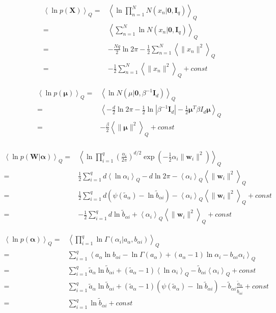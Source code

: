 \documentclass[10pt]{article}
\newcommand{\Angle}[1]{\left \langle #1 \right \rangle}
\newcommand{\Eq}[1]{\Angle{#1}_Q}
\newcommand{\Det}[1]{\left| #1 \right|}
\begin{document}
	\begin{align}
		\Eq{\ln{p(\bm{X})}}=&\Eq{\ln{\prod_{n=1}^{N}{N(x_n|\bm{0},\bm{I}_q)}}} \\
		=&\Eq{\sum_{n=1}^{N}{\ln{N(x_n|\bm{0},\bm{I}_q)}}} \\
		=&-\frac{Nq}{2}\ln{2\pi}-\frac{1}{2}\sum_{n=1}^{N}{\Eq{\|x_n\|^2}} \\
		=&-\frac{1}{2}\sum_{n=1}^{N}{\Eq{\|x_n\|^2}}+const
	\end{align}	
	
	\begin{align}
		\Eq{\ln{p(\bm{\mu})}}=&\Eq{\ln{N(\mu|\bm{0},\beta^{-1}\bm{I}_d)}}\\
		=&\Eq{-\frac{d}{2}\ln{2\pi}-\frac{1}{2}\ln{\Det{\beta^{-1}\bm{I}_d}}-\frac{1}{2}\bm{\mu}^T\beta I_d\bm{\mu}} \\
		=&-\frac{\beta}{2}\Eq{\|\bm{\mu}\|^2}+const \\
	\end{align}	
	
	\begin{align}
		\Eq{\ln{p(\bm{W} \vert \bm{\alpha})}}=&\Eq{\ln{\prod_{i=1}^q \left( \frac{\alpha_i}{2\pi} \right)^{d/2} \exp \left( -\frac{1}{2}\alpha_i \| \bm{w}_i \|^2 \right) }} \\
		=&\frac{1}{2}\sum_{i=1}^q d\Eq{\ln{\alpha_i}} - d\ln{2\pi} -\Eq{\alpha_i} \Eq{\| \bm{w}_i \|^2 } \\
		=&\frac{1}{2}\sum_{i=1}^q d(\psi(\tilde{a}_\alpha)-\ln{\tilde{b}_{\alpha i}})-\Eq{\alpha_i} \Eq{\| \bm{w}_i \|^2 } + const \\
		=&-\frac{1}{2}\sum_{i=1}^q d\ln{\tilde{b}_{\alpha i}}+\Eq{\alpha_i} \Eq{\| \bm{w}_i \|^2 } + const
	\end{align}		
	
	\begin{align}
		\Eq{\ln{p(\bm{\alpha})}}=&\Eq{\prod_{i=1}^q \ln \Gamma(\alpha_i \vert a_\alpha,b_{\alpha i})} \\
		=&\sum_{i=1}^q \Eq{a_\alpha\ln{b_{\alpha i}}-\ln{\Gamma(a_\alpha)}+(a_\alpha-1)\ln{\alpha_i}-b_{\alpha i} \alpha_i} \\
		=&\sum_{i=1}^q \tilde{a}_\alpha\ln{\tilde{b}_{\alpha i}}+(\tilde{a}_\alpha-1)\Eq{\ln{\alpha_i}}-\tilde{b}_{\alpha i}\Eq{\alpha_i} + const \\
		=&\sum_{i=1}^q \tilde{a}_\alpha\ln{\tilde{b}_{\alpha i}}+(\tilde{a}_\alpha-1)(\psi(\tilde{a}_\alpha)-\ln{\tilde{b}_{\alpha i}})-\tilde{b}_{\alpha i}\frac{\tilde{a}_\alpha}{\tilde{b}_{\alpha i}} + const \\
		=&\sum_{i=1}^q \ln{\tilde{b}_{\alpha i}} + const
	\end{align}		
	
\end{document}

